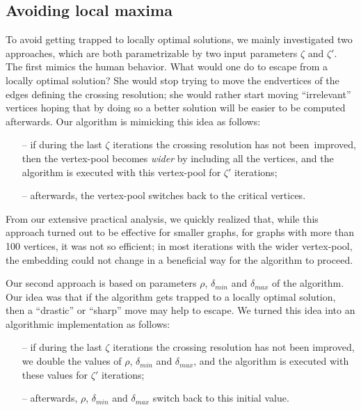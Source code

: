 \documentclass{comjnl}
\begin{document}
\subsection{Avoiding local maxima}
\label{ssec:bottlenecks}
%
To avoid getting trapped to locally optimal solutions, we mainly investigated two approaches, which are both  parametrizable by two input parameters $\zeta$ and $\zeta'$. The first mimics the human behavior. What would one do to escape from a locally optimal solution? She would stop trying to move the endvertices of the edges defining the crossing resolution; she would rather start moving ``irrelevant'' vertices hoping that by doing so a better solution will be easier to be computed afterwards. Our algorithm is mimicking this idea as follows:
%
\begin{itemize}
\item[--] if during the last $\zeta$ iterations the crossing resolution has not been~improved, then the vertex-pool becomes \emph{wider} by including all the vertices, and the algorithm is executed with this vertex-pool for $\zeta'$ iterations;
\item[--] afterwards, the vertex-pool switches back to the critical vertices.
\end{itemize}

From our extensive practical analysis, we quickly realized that, while this approach turned out to be effective for smaller graphs, for graphs with more than 100 vertices, it was not so efficient; in most iterations with the wider vertex-pool, the embedding could not change in a beneficial way for the algorithm to proceed.

Our second approach is based on parameters $\rho$, $\delta_{min}$ and $\delta_{max}$ of the algorithm. Our idea was that if the algorithm gets trapped to a locally optimal solution, then a ``drastic'' or ``sharp'' move may help to escape. We turned this idea into an algorithmic implementation as follows:
%
\begin{itemize}
\item[--] if during the last $\zeta$ iterations the crossing resolution has not been improved, we double the values of $\rho$, $\delta_{min}$ and $\delta_{max}$, and the algorithm is executed with these values for $\zeta'$ iterations;
\item[--] afterwards, $\rho$, $\delta_{min}$ and $\delta_{max}$ switch back to this initial value.
\end{itemize}
\end{document}
